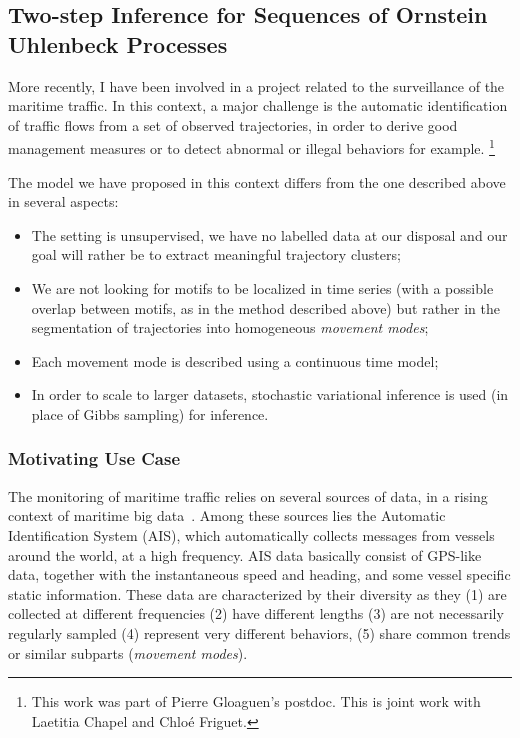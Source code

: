 \subsection{Two-step Inference for Sequences of Ornstein Uhlenbeck Processes}
\label{sec:oup}

More recently, I have been involved in a project related to the surveillance of
the maritime traffic.
In this context, a major challenge
is the automatic identification of traffic flows from a set of observed
trajectories, in order to derive good management measures or to detect abnormal
or illegal behaviors for example.%
\footnote{This work was part of Pierre Gloaguen's postdoc.
This is joint work with Laetitia Chapel and Chloé Friguet.}

The model we have proposed in this context differs from the one described above
in several aspects:

\begin{itemize}
\item The setting is unsupervised, we have no labelled data at our disposal
and our goal will rather be to extract meaningful trajectory clusters;
\item We are not looking for motifs to be localized in time series (with
a possible overlap between motifs, as in the method described above) but rather
in the segmentation of trajectories into homogeneous \emph{movement modes};
\item Each movement mode is described using a continuous time model;
\item In order to scale to larger datasets, stochastic variational inference is used
(in place of Gibbs sampling) for inference.
\end{itemize}

\subsubsection{Motivating Use Case}

The monitoring of maritime traffic relies on several sources of data, in a
rising context of maritime big data~\cite{garnier2016exploiting}.
Among these sources lies the Automatic Identification System (AIS), which
automatically collects messages from vessels around the world, at a high
frequency.
AIS data basically consist of GPS-like data, together with the instantaneous
speed and heading, and some vessel specific static information.
These data are characterized by their diversity as they (1) are collected at
different frequencies (2) have different lengths (3) are not necessarily
regularly sampled (4) represent very different behaviors, (5) share common
trends or similar subparts (\emph{movement modes}).


